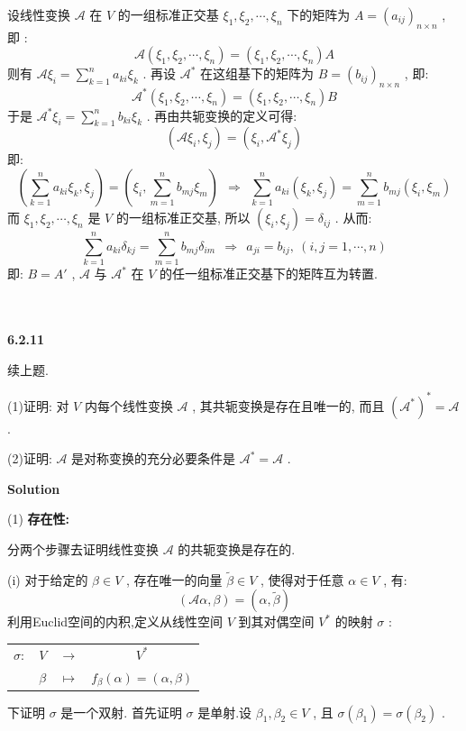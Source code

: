 \documentclass[11pt,a4paper,openany,oneside]{book}
\newcommand\Solution{\noindent\textbf{\textsf{Solution}}\par\medskip}
\begin{document}
设线性变换 $ \mathcal{A} $ 在 $ V $ 的一组标准正交基 $ \xi_1, \xi_2, \cdots, \xi_n $ 下的矩阵为 $ A = (a_{ij})_{n \times n} $ , 即 :
 $$  \mathcal{A}(\xi_1, \xi_2, \cdots, \xi_n) = (\xi_1, \xi_2, \cdots, \xi_n)A  $$ 
则有 $ \mathcal{A}\xi_i = \sum\limits_{k=1}^n a_{ki}\xi_k $ . 再设 $ \mathcal{A}^* $ 在这组基下的矩阵为 $ B = (b_{ij})_{n \times n} $ , 即:
 $$  \mathcal{A}^*(\xi_1, \xi_2, \cdots, \xi_n) = (\xi_1, \xi_2, \cdots, \xi_n)B  $$ 
于是 $ \mathcal{A}^*\xi_i = \sum\limits_{k=1}^n b_{ki}\xi_k $ . 再由共轭变换的定义可得:
 $$  (\mathcal{A}\xi_i, \xi_j) = (\xi_i, \mathcal{A}^*\xi_j)   $$ 
即:
 $$  (\sum\limits_{k=1}^n a_{ki}\xi_k, \xi_j) = (\xi_i, \sum\limits_{m=1}^n b_{mj}\xi_m) \ \ \Rightarrow \ \ \sum\limits_{k=1}^n a_{ki}(\xi_k, \xi_j) = \sum\limits_{m=1}^n b_{mj}(\xi_i,\xi_m)  $$ 
而 $ \xi_1, \xi_2, \cdots, \xi_n $ 是 $ V $ 的一组标准正交基, 所以 $ (\xi_i, \xi_j) = \delta_{ij} $ . 从而:
 $$  \sum\limits_{k=1}^n a_{ki}\delta_{kj} = \sum\limits_{m=1}^n b_{mj}\delta_{im} \ \ \Rightarrow \ \ a_{ji} = b_{ij}, \ (i,j = 1, \cdots, n) $$ 
即: $ B=A' $ ,  $ \mathcal{A} $ 与 $ \mathcal{A}^* $ 在 $ V $ 的任一组标准正交基下的矩阵互为转置.  \\  \\  \\





\begin{myexample}
	\textbf{6.2.11}

续上题. 

(1)证明: 对 $ V $ 内每个线性变换 $ \mathcal{A} $ , 其共轭变换是存在且唯一的, 而且 $ (\mathcal{A}^*)^* = \mathcal{A} $ .

(2)证明:  $ \mathcal{A} $ 是对称变换的充分必要条件是 $ \mathcal{A}^* = \mathcal{A} $ .\\

\end{myexample}
\Solution 

(1) \textbf{存在性:}

分两个步骤去证明线性变换 $ \mathcal{A} $ 的共轭变换是存在的. 

(i) 对于给定的 $ \beta \in V $ , 存在唯一的向量 $ \widetilde{\beta} \in V $ , 使得对于任意 $ \alpha \in V $ , 有:
 $$  (\mathcal{A}\alpha, \beta) = (\alpha, \widetilde{\beta})  $$ 
利用Euclid空间的内积,定义从线性空间 $ V $ 到其对偶空间 $ V^* $ 的映射 $ \sigma $ :
\begin{center}
	\begin{tabular}{cccc}
		 $ \sigma: $   &   $ V $      &   $ \rightarrow $   &   $ V^* $   \\
		&   $ \beta $  &   $ \mapsto $       &  $ f_{\beta}(\alpha)=(\alpha, \beta) $  
	\end{tabular}
\end{center}
下证明 $ \sigma $ 是一个双射. 首先证明 $ \sigma $ 是单射.设 $ \beta_1, \beta_2 \in V $ , 且 $ \sigma(\beta_1) = \sigma(\beta_2) $ .
\end{document}
